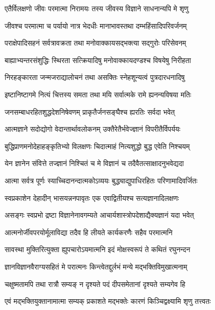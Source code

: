 \twolineshloka
{एतैर्विलक्षणो जीवः परमात्मा निरामयः}
{तस्य जीवस्य विज्ञाने साधनान्यपि मे शृणु} %

\twolineshloka
{जीवश्च परमात्मा च पर्यायो नात्र भेदधीः}
{मानाभावस्तथा दम्भहिंसादिपरिवर्जनम्} %

\twolineshloka
{पराक्षेपादिसहनं सर्वत्रावक्रता तथा}
{मनोवाक्कायसद्भक्त्या सद्गुरोः परिसेवनम्} %

\twolineshloka
{बाह्याभ्यन्तरसंशुद्धिः स्थिरता सत्क्रियादिषु}
{मनोवाक्कायदण्डश्च विषयेषु निरीहता} %

\twolineshloka
{निरहङ्कारता जन्मजराद्यालोचनं तथा}
{असक्तिः स्नेहशून्यत्वं पुत्रदारधनादिषु} %

\twolineshloka
{इष्टानिष्टागमे नित्यं चित्तस्य समता तथा}
{मयि सर्वात्मके रामे ह्यनन्यविषया मतिः} %

\twolineshloka
{जनसम्बाधरहितशुद्धदेशनिषेवणम्}
{प्राकृतैर्जनसङ्घैश्च ह्यरतिः सर्वदा भवेत्} %

\twolineshloka
{आत्मज्ञाने सदोद्योगो वेदान्तार्थावलोकनम्}
{उक्तैरेतैर्भवेज्ज्ञानं विपरीतैर्विपर्ययः} %

\twolineshloka
{बुद्धिप्राणमनोदेहाहङ्कृतिभ्यो विलक्षणः}
{चिदात्माहं नित्यशुद्धो बुद्ध एवेति निश्चयम्} %

\twolineshloka
{येन ज्ञानेन संवित्ते तज्ज्ञानं निश्चितं च मे}
{विज्ञानं च तदैवैतत्साक्षादनुभवेद्यदा} %

\twolineshloka
{आत्मा सर्वत्र पूर्णः स्याच्चिदानन्दात्मकोऽव्ययः}
{बुद्ध्याद्युपाधिरहितः परिणामादिवर्जितः} %

\twolineshloka
{स्वप्रकाशेन देहादीन् भासयन्ननपावृतः}
{एक एवाद्वितीयश्च सत्यज्ञानादिलक्षणः} %

\twolineshloka
{असङ्गः स्वप्रभो द्रष्टा विज्ञानेनावगम्यते}
{आचार्यशास्त्रोपदेशाद्यैक्यज्ञानं यदा भवेत्} %

\twolineshloka
{आत्मनोर्जीवपरयोर्मूलाविद्या तदैव हि}
{लीयते कार्यकरणैः सहैव परमात्मनि} %

\twolineshloka
{सावस्था मुक्तिरित्युक्ता ह्युपचारोऽयमात्मनि}
{इदं मोक्षस्वरूपं ते कथितं रघुनन्दन} %

\twolineshloka
{ज्ञानविज्ञानवैराग्यसहितं मे परात्मनः}
{किन्त्वेतद्दुर्लभं मन्ये मद्भक्तिविमुखात्मनाम्} %

\twolineshloka
{चक्षुष्मतामपि तथा रात्रौ सम्यङ् न दृश्यते}
{पदं दीपसमेतानां दृश्यते सम्यगेव हि} %

\twolineshloka
{एवं मद्भक्तियुक्तानामात्मा सम्यक् प्रकाशते}
{मद्भक्तेः कारणं किञ्चिद्वक्ष्यामि शृणु तत्त्वतः} %

